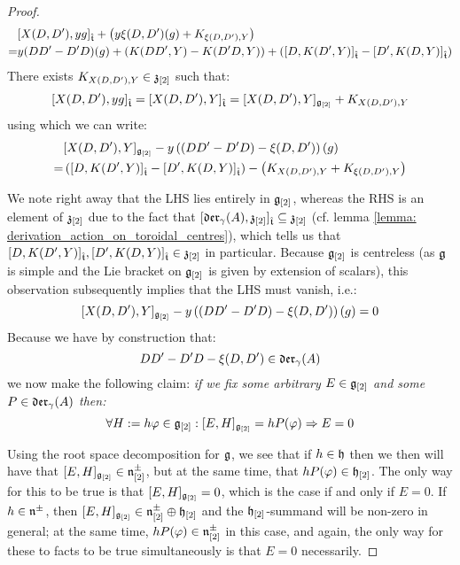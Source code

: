 \begin{proof}
                    $$
                        \begin{aligned}
                            & [ X(D, D') , y g ]_{\hat{\mathfrak{t}}} + \left( y \xi(D, D')(g) + K_{\xi(D, D'), Y} \right)
                            \\
                            = & y (DD' - D'D)( g ) + ( K(DD', Y) - K(D'D, Y) ) + ( [ D, K(D', Y) ]_{\hat{\mathfrak{t}}} - [ D', K(D, Y) ]_{\hat{\mathfrak{t}}} )
                        \end{aligned}
                    $$
                There exists $K_{X(D, D'), Y} \in \mathfrak{z}_{[2]}$ such that:
                    $$[ X(D, D') , y g ]_{\hat{\mathfrak{t}}} = [ X(D, D') , Y ]_{\hat{\mathfrak{t}}} = [X(D, D'), Y]_{\mathfrak{g}_{[2]}} + K_{X(D, D'), Y}$$
                using which we can write:
                    $$
                        \begin{aligned}
                            & [X(D, D'), Y]_{\mathfrak{g}_{[2]}} - y \left( ( DD' - D'D) - \xi(D, D') \right)( g )
                            \\
                            = & \left( [ D, K(D', Y) ]_{\hat{\mathfrak{t}}} - [ D', K(D, Y) ]_{\hat{\mathfrak{t}}} \right) - \left( K_{X(D, D'), Y} + K_{\xi(D, D'), Y} \right)
                        \end{aligned}
                    $$
                    
                We note right away that the LHS lies entirely in $\mathfrak{g}_{[2]}$, whereas the RHS is an element of $\mathfrak{z}_{[2]}$ due to the fact that $[\mathfrak{der}_{\gamma}(A), \mathfrak{z}_{[2]}]_{\hat{\mathfrak{t}}} \subseteq \mathfrak{z}_{[2]}$ (cf. lemma \ref{lemma: derivation_action_on_toroidal_centres}), which tells us that $[ D, K(D', Y) ]_{\hat{\mathfrak{t}}}, [ D', K(D, Y) ]_{\hat{\mathfrak{t}}} \in \mathfrak{z}_{[2]}$ in particular. Because $\mathfrak{g}_{[2]}$ is centreless (as $\mathfrak{g}$ is simple and the Lie bracket on $\mathfrak{g}_{[2]}$ is given by extension of scalars), this observation subsequently implies that the LHS must vanish, i.e.:
                    $$[X(D, D'), Y]_{\mathfrak{g}_{[2]}} - y \left( ( DD' - D'D) - \xi(D, D') \right)( g ) = 0$$
                Because we have by construction that:
                    $$DD' - D'D - \xi(D, D') \in \mathfrak{der}_{\gamma}(A)$$
                we now make the following claim: \textit{if we fix some arbitrary $E \in \mathfrak{g}_{[2]}$ and some $P \in \mathfrak{der}_{\gamma}(A)$ then:}
                    $$\forall H := h \varphi \in \mathfrak{g}_{[2]}: [E, H]_{\mathfrak{g}_{[2]}} = h P( \varphi ) \Rightarrow E = 0$$

                Using the root space decomposition for $\mathfrak{g}$, we see that if $h \in \mathfrak{h}$ then we then will have that $[E, H]_{\mathfrak{g}_{[2]}} \in \mathfrak{n}^{\pm}_{[2]}$, but at the same time, that $h P(\varphi) \in \mathfrak{h}_{[2]}$. The only way for this to be true is that $[E, H]_{\mathfrak{g}_{[2]}} = 0$, which is the case if and only if $E = 0$. If $h \in \mathfrak{n}^{\pm}$, then $[E, H]_{\mathfrak{g}_{[2]}} \in \mathfrak{n}^{\pm}_{[2]} \oplus \mathfrak{h}_{[2]}$ and the $\mathfrak{h}_{[2]}$-summand will be non-zero in general; at the same time, $h P(\varphi) \in \mathfrak{n}^{\pm}_{[2]}$ in this case, and again, the only way for these to facts to be true simultaneously is that $E = 0$ necessarily. 


\end{proof}

